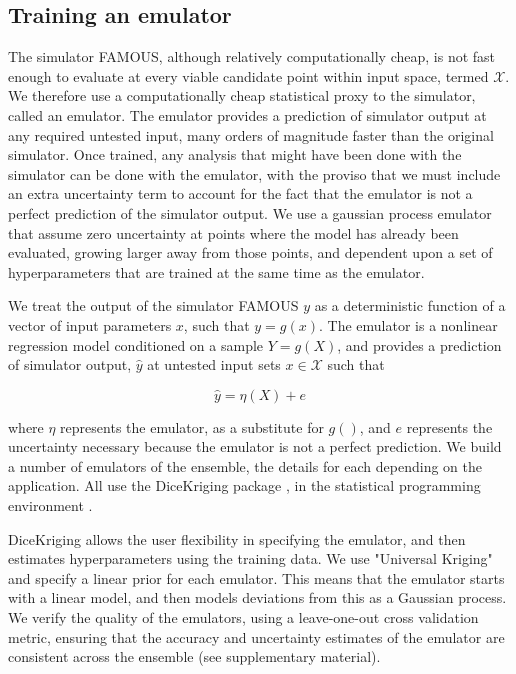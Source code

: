 \documentclass[esd, manuscript]{copernicus}
\begin{document}
\subsection{Training an emulator}\label{emulator}
The simulator FAMOUS, although relatively computationally cheap, is not fast enough to evaluate at every viable candidate point within input space, termed $\mathcal{X}$. We therefore use a computationally cheap statistical proxy to the simulator, called an emulator. The emulator provides a prediction of simulator output at any required untested input, many orders of magnitude faster than the original simulator.  Once trained, any analysis that might have been done with the simulator can be done with the emulator, with the proviso that we must include an extra uncertainty term to account for the fact that the emulator is not a perfect prediction of the simulator output. We use a gaussian process emulator that assume zero uncertainty at points where the model has already been evaluated, growing larger away from those points, and dependent upon a set of hyperparameters that are trained at the same time as the emulator. 

We treat the output of the simulator FAMOUS $y$ as a deterministic function of a vector of input parameters $x$, such that $y=g(x)$. The emulator is a nonlinear regression model conditioned on a sample $Y = g(X)$, and provides a prediction of simulator output,  $\hat{y}$ at untested input sets $x \in \mathcal{X}$ such that 

\begin{equation}
\hat{y} = \eta(X) + e
\end{equation}

where $\eta$ represents the emulator, as a substitute for $g()$, and  $e$ represents the uncertainty necessary because the emulator is not a perfect prediction. We build a number of emulators of the ensemble, the details for each depending on the application. All use the DiceKriging package \citep{roustant2012dicekriging}, in the statistical programming environment \citep{Rcore2016}.

DiceKriging allows the user flexibility in specifying the emulator, and then estimates hyperparameters using the training data. We use "Universal Kriging" and specify a linear prior  for each emulator. This means that the emulator starts with a linear model, and then models deviations from this as a Gaussian process. We verify the quality of the emulators, using a leave-one-out cross validation metric, ensuring that the accuracy and uncertainty estimates of the emulator are consistent across the ensemble (see supplementary material). 
\end{document}
